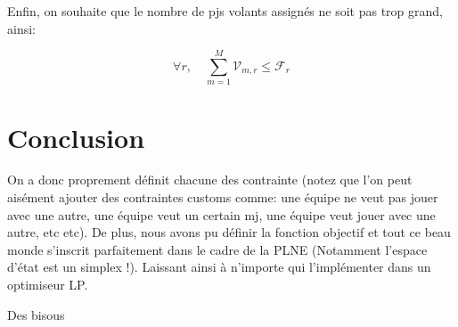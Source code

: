 \documentclass[11pt,a4paper]{article}
\begin{document}
Enfin, on souhaite que le nombre de pjs volants assignés ne soit pas trop grand, ainsi:

\begin{equation}
	\forall r, \quad \sum_{m=1}^M \mathcal{V}_{m,r} \leq \mathcal{F}_{r}
\end{equation}

\section{Conclusion}

On a donc proprement définit chacune des contrainte (notez que l'on peut aisément ajouter des contraintes customs comme: une équipe ne veut pas jouer avec une autre, une équipe veut un certain mj, une équipe veut jouer avec une autre, etc etc). De plus, nous avons pu définir la fonction objectif et tout ce beau monde s'inscrit parfaitement dans le cadre de la PLNE (Notamment l'espace d'état est un simplex !). Laissant ainsi à n'importe qui l'implémenter dans un optimiseur LP.



Des bisous
\end{document}
